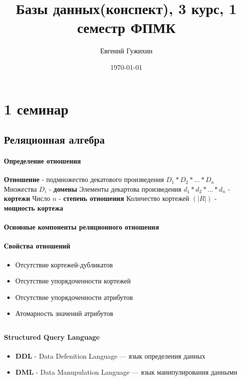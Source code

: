 \documentclass[a5paper,10pt]{article}
\author{Евгений Гужихин}
\title{Базы данных(конспект), 3 курс, 1 семестр ФПМК}
\date{\today}
\begin{document}
	\maketitle
	\tableofcontents{}
	\newpage

	\section{1 семинар}
		\subsection{Реляционная алгебра}
			\paragraph{Определение отношения}	
				\textbf{Отношение} - подмножество декатового произведения $ D_1 * D_2 * ... * D_n $
				Множества $ D_i $ - \textbf{домены}
				Элементы декартова произведения $ d_1 * d_2 * ... * d_n $ - \textbf{кортежи}
				Число $ n $ - \textbf{степень отношения}
				Количество кортежей $ (|R|) $ - \textbf{мощность кортежа}

			\paragraph{Основные компоненты реляционного отношения}

			\paragraph{Свойства отношений}
				\begin{itemize}
					\item Отсутствие кортежей-дубликатов
					\item Отсутствие упорядоченности кортежей
					\item Отсутствие упорядоченности атрибутов
					\item Атомарность значений атрибутов
				\end{itemize}

		\subsection{}
			\paragraph{\textbf{S}tructured \textbf{Q}uery \textbf{L}anguage}
				\begin{itemize}
					\item \textbf{DDL} - Data Defenition Language --- язык определения данных
					\item \textbf{DML} - Data Manupulation Language --- язык манипулирования данными
				\end{itemize}
\end{document}
